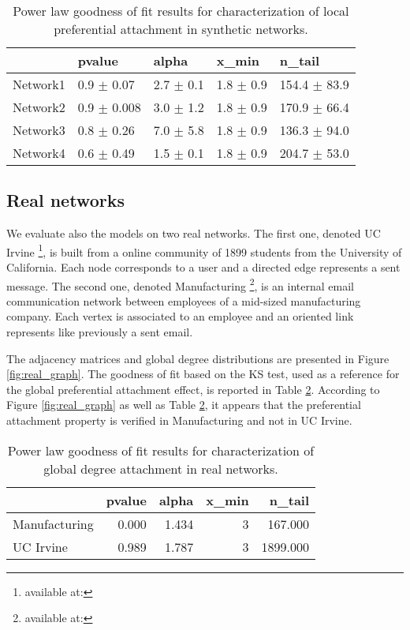 \documentclass[a4paper, 12pt]{article}
\begin{document}
\begin{table}[h]
\caption{Power law goodness of fit results for characterization of local preferential attachment in synthetic networks.}
\centering
    \begin{tabular}{lllll}
    \hline
    & pvalue          & alpha           & x\_min        & n\_tail           \\
    \hline
    Network1 & 0.9 $\pm$ 0.07  & 2.7 $\pm$ 0.1 & 1.8 $\pm$ 0.9 & 154.4 $\pm$ 83.9 \\
    Network2 & 0.9 $\pm$ 0.008 & 3.0 $\pm$ 1.2  & 1.8 $\pm$ 0.9 & 170.9 $\pm$ 66.4  \\
    Network3 & 0.8 $\pm$ 0.26 & 7.0 $\pm$ 5.8 & 1.8 $\pm$ 0.9 & 136.3 $\pm$ 94.0 \\
    Network4 & 0.6 $\pm$ 0.49    & 1.5 $\pm$ 0.1 & 1.8 $\pm$ 0.9 & 204.7 $\pm$ 53.0 \\
    \hline
    \end{tabular}
\label{table:synt_graph_local}
\end{table}

\subsection{Real networks}

We evaluate also the models on two real networks.
The first one, denoted UC Irvine \footnote{available at:}, is built from a online community of 1899 students from the University of California. Each node corresponds to a user and a   directed edge represents a sent message.
The second one, denoted Manufacturing \footnote{available at:}, is an internal email communication network between employees of a mid-sized manufacturing company. Each vertex is associated  to an employee and an oriented link represents like previously a sent email.

The adjacency matrices and global degree distributions are presented in Figure \ref{fig:real_graph}. The goodness of fit based on the KS test, used as a reference for the global preferential attachment effect, is reported in Table \ref{table:real_graph}. According to Figure \ref{fig:real_graph} as well as Table \ref{table:real_graph}, it appears that the preferential attachment property is verified in Manufacturing and not in UC Irvine.



\begin{table}
\caption{Power law goodness of fit results for characterization of global degree attachment in real networks.}
\centering
\begin{tabular}{lrrrr}
   &   pvalue &   alpha &   x\_min &   n\_tail \\
\hline
 Manufacturing &    0.000 &   1.434 &       3 &  167.000 \\
 UC Irvine     &    0.989 &   1.787 &       3 & 1899.000 \\
\hline
\end{tabular}
\label{table:real_graph}
\end{table}
\end{document}
